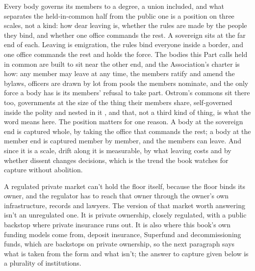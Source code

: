 Every body governs its members to a degree, a union included, and what separates the held-in-common half from the public one is a position on three scales, not a kind: how dear leaving is, whether the rules are made by the people they bind, and whether one office commands the rest. A sovereign sits at the far end of each. Leaving is emigration, the rules bind everyone inside a border, and one office commands the rest and holds the force. The bodies this Part calls held in common are built to sit near the other end, and the Association's charter is how: any member may leave at any time, the members ratify and amend the bylaws, officers are drawn by lot from pools the members nominate, and the only force a body has is its members' refusal to take part. Ostrom's commons sit there too, governments at the size of the thing their members share, self-governed inside the polity and nested in it \autocite{ostrom1990governing}, and that, not a third kind of thing, is what the word means here. The position matters for one reason. A body at the sovereign end is captured whole, by taking the office that commands the rest; a body at the member end is captured member by member, and the members can leave. And since it is a scale, drift along it is measurable, by what leaving costs and by whether dissent changes decisions, which is the trend the book watches for capture without abolition.

A regulated private market can't hold the floor itself, because the floor binds its owner, and the regulator has to reach that owner through the owner's own infrastructure, records and lawyers.
The version of that market worth answering isn't an unregulated one. It is private ownership, closely regulated, with a public backstop where private insurance runs out.
It is also where this book's own funding models come from, deposit insurance, Superfund and decommissioning funds, which are backstops on private ownership, so the next paragraph says what is taken from the form and what isn't; the answer to capture given below is a plurality of institutions.

